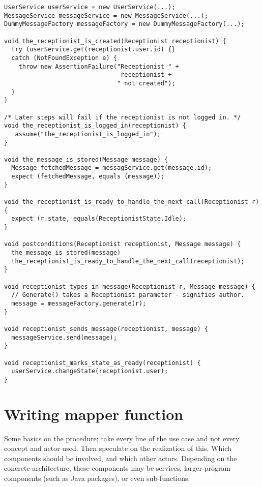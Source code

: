 \begin{lstlisting}[style=Dart, caption=Example template methods (written manually),label={lst:example-template-methods}]
UserService userService = new UserService(...);
MessageService messageService = new MessageService(...);
DummyMessageFactory messageFactory = new DummyMessageFactory(...);
  
void the_receptionist_is_created(Receptionist receptionist) {
  try (userService.get(receptionist.user.id) {}
  catch (NotFoundException e) {
    throw new AssertionFailure("Receptionist " + 
                                receptionist + 
                               " not created");
  }
}

/* Later steps will fail if the receptionist is not logged in. */
void the_receptionist_is_logged_in(receptionist) {
   assume("the_receptionist_is_logged_in");
}

void the_message_is_stored(Message message) {
  Message fetchedMessage = messagService.get(message.id);
  expect (fetchedMessage, equals (message));
}

void the_receptionist_is_ready_to_handle_the_next_call(Receptionist r) {
  expect (r.state, equals(ReceptionistState.Idle);
}

void postconditions(Receptionist receptionist, Message message) {
  the_message_is_stored(message)
  the_receptionist_is_ready_to_handle_the_next_call(receptionist);
}

void receptionist_types_in_message(Receptionist r, Message message) {
  // Generate() takes a Receptionist parameter - signifies author.
  message = messageFactory.generate(r);
}

void receptionist_sends_message(receptionist, message) {
  messageService.send(message);
}

void receptionist_marks_state_as_ready(receptionist) {
  userService.changeState(receptionist.user);
} 
\end{lstlisting}

\section{Writing mapper function}
Some basics on the procedure; take every line of the use case and not every concept and actor used. Then speculate on the realization of this. Which components should be involved, and which other actors. Depending on the concrete architecture, these components may be services, larger program components (such as Java packages), or even sub-functions.


